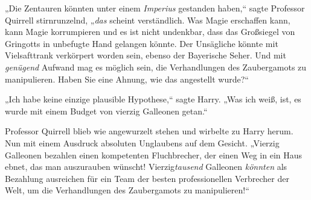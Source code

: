 „Die Zentauren könnten unter einem \emph{Imperius} gestanden haben,“ sagte Professor Quirrell stirnrunzelnd, „\emph{das} scheint verständlich. Was Magie erschaffen kann, kann Magie korrumpieren und es ist nicht undenkbar, dass das Großsiegel von Gringotts in unbefugte Hand gelangen könnte. Der Unsägliche könnte mit Vielsafttrank verkörpert worden sein, ebenso der Bayerische Seher.
Und mit \emph{genügend} Aufwand mag es möglich sein, die Verhandlungen des Zaubergamots zu manipulieren. Haben Sie eine Ahnung, wie das angestellt wurde?“

„Ich habe keine einzige plausible Hypothese,“ sagte Harry. „Was ich weiß, ist, es wurde mit einem Budget von vierzig Galleonen getan.“

Professor Quirrell blieb wie angewurzelt stehen und wirbelte zu Harry herum. Nun mit einem Ausdruck absoluten Unglaubens auf dem Gesicht. „Vierzig Galleonen bezahlen einen kompetenten Fluchbrecher, der einen Weg in ein Haus ebnet, das man auszurauben wünscht! Vierzig\emph{tausend} Galleonen \emph{könnten} als Bezahlung ausreichen für ein Team der besten professionellen Verbrecher der Welt, um die Verhandlungen des Zaubergamots zu manipulieren!“

